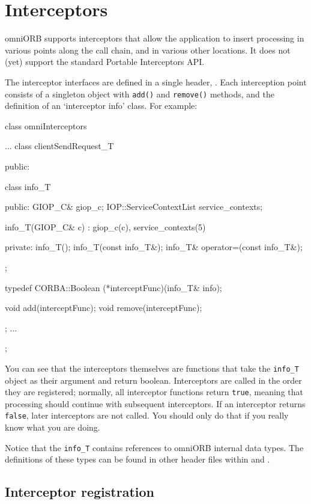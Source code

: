 \documentclass[11pt,oneside,a4paper]{book}
\newcommand{\code}[1]{\texttt{#1}}
\newcommand{\op}[1]{\texttt{#1()}}
\begin{document}
\chapter{Interceptors}
\label{chap:interceptors}

omniORB supports interceptors that allow the application to insert
processing in various points along the call chain, and in various
other locations. It does not (yet) support the standard Portable
Interceptors API.

The interceptor interfaces are defined in a single header,
. Each interception point
consists of a singleton object with \op{add} and \op{remove} methods,
and the definition of an `interceptor info' class. For example:

\begin{cxxlisting}
class omniInterceptors {
  ...
  class clientSendRequest_T {
  public:

    class info_T {
    public:
      GIOP_C&                 giop_c;
      IOP::ServiceContextList service_contexts;

      info_T(GIOP_C& c) : giop_c(c), service_contexts(5) {}

    private:
      info_T();
      info_T(const info_T&);
      info_T& operator=(const info_T&);
    };

    typedef CORBA::Boolean (*interceptFunc)(info_T& info);

    void add(interceptFunc);
    void remove(interceptFunc);
  };
  ...
};
\end{cxxlisting}

\noindent You can see that the interceptors themselves are functions
that take the \code{info\_T} object as their argument and return
boolean. Interceptors are called in the order they are registered;
normally, all interceptor functions return \code{true}, meaning that
processing should continue with subsequent interceptors. If an
interceptor returns \code{false}, later interceptors are not
called. You should only do that if you really know what you are doing.

Notice that the \code{info\_T} contains references to omniORB internal
data types. The definitions of these types can be found in other
header files within  and
.


\section{Interceptor registration}
\end{document}
